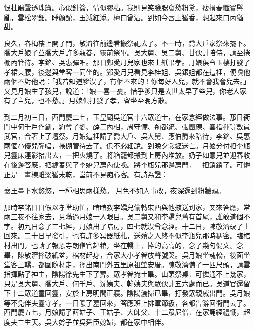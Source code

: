 恨杜鵑聲透珠簾。心似針簽，情似膠粘。我則見笑臉腮窩愁粉黛，瘦損春纖寶髻亂，雲松翠鈿。睡顏酡，玉減紅添。檀口曾沾。到如今唇上猶香，想起來口內猶甜。

良久，春梅樓上開了門，敬濟往前邊看搬祭祀去了。不一時，喬大戶家祭來擺下。喬大戶娘子並喬大戶許多親眷，靈前祭畢。吳大舅、吳二舅、甘伙計陪侍，請至捲棚內管待。李銘、吳惠彈唱。那日鄭愛月兒家也來上紙弔孝。月娘俱令玉樓打發了孝裙束腰，後邊與堂客一同坐的。鄭愛月兒看見李桂姐、吳銀姐都在這裡，便嗔他兩個不對他說：「我若知道爹沒了，有個不來的！你每好人兒，就不會我會兒去。」又見月娘生了孩兒，說道：「娘一喜一憂。惜乎爹只是去世太早了些兒，你老人家有了主兒，也不愁。」月娘俱打發了孝，留坐至晚方散。

到二月初三日，西門慶二七，玉皇廟吳道官十六眾道士，在家念經做法事。那日衙門中何千戶作創，約會了劉、薛二內相，周守備、荊都統、張團練、雲指揮等數員武官，合著上了壇祭。月娘這裡請了喬大戶、吳大舅、應伯爵來陪待，李銘、吳惠兩個小優兒彈唱，捲棚管待去了。俱不必細說。到晚夕念經送亡。月娘分付把李瓶兒靈床連影抬出去，一把火燒了。將箱籠都搬到上房內堆放。奶子如意兒並迎春收在後邊答應，把繡春與了李嬌兒房內使喚。將李瓶兒那邊房門，一把鎖鎖了。可憐正是：畫棟雕梁猶未乾，堂前不見痴心客。有詩為證：

襄王臺下水悠悠，一種相思兩樣愁。
月色不如人事改，夜深還到粉牆頭。

那時李銘日日假以孝堂助忙，暗暗教李嬌兒偷轉東西與他掖送到家，又來答應，常兩三夜不往家去，只瞞過月娘一人眼目。吳二舅又和李嬌兒舊有首尾，誰敢道個不字。初九日念了三七經，月娘出了暗房，四七就沒曾念經。十二日，陳敬濟破了土回來。二十日早發引，也有許多冥器紙札，送殯之人終不似李瓶兒那時稠密。臨棺材出門，也請了報恩寺朗僧官起棺，坐在轎上，捧的高高的，念了幾句偈文。念畢，陳敬濟摔破紙盆，棺材起身，合家大小孝眷放聲號哭。吳月娘坐魂轎，後面坐堂客上轎，都圍隨材走，徑出南門外五里原祖塋安厝。陳敬濟備了一匹尺頭，請雲指揮點了神主，陰陽徐先生下了葬。眾孝眷掩土畢。山頭祭桌，可憐通不上幾家，只是吳大舅、喬大戶、何千戶、沈姨夫、韓姨夫與眾伙計五六處而已。吳道官還留下十二眾道童回靈，安於上房明間正寢。陰陽灑掃已畢，打發眾親戚出門。吳月娘等不免伴夫靈守孝。一日暖了墓回來，答應班上排軍節級，各都告辭回衙門去了。西門慶五七，月娘請了薛姑子、王姑子、大師父、十二眾尼僧，在家誦經禮懺，超度夫主生天。吳大妗子並吳舜臣媳婦，都在家中相伴。

